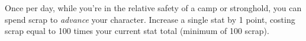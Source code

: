 
Once per day, while you're in the relative safety of a camp or stronghold, you can spend scrap to \emph{advance} your character. Increase a single stat by 1 point, costing scrap equal to 100 times your current stat total (minimum of 100 scrap).
